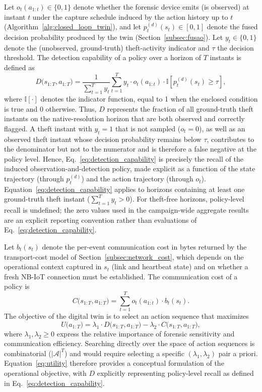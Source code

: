 \documentclass{ieeeaccess}
\begin{document}
Let $o_t(a_{1:t}) \in \{0,1\}$ denote whether the forensic device emits (is observed) at instant $t$ under the capture schedule induced by the action history up to $t$ (Algorithm~\ref{alg:closed_loop_twin}), and let $p_t^{(d)}(s_t) \in [0,1]$ denote the fused decision probability produced by the twin (Section~\ref{subsec:fusao}). Let $y_t \in \{0,1\}$ denote the (unobserved, ground-truth) theft-activity indicator and $\tau$ the decision threshold. The detection capability of a policy over a horizon of $T$ instants is defined as
\begin{equation}
D\big(s_{1:T}, a_{1:T}\big) =
\frac{1}{\sum_{t=1}^{T} y_t}
\sum_{t=1}^{T}
y_t \cdot o_t(a_{1:t}) \cdot
\mathbb{I}\left[p_t^{(d)}(s_t)\ge\tau\right],
\label{eq:detection_capability}
\end{equation}
where $\mathbb{I}[\cdot]$ denotes the indicator function, equal to 1 when the enclosed condition is true and 0 otherwise. Thus, $D$ represents the fraction of all ground-truth theft instants on the native-resolution horizon that are both observed and correctly flagged. A theft instant with $y_t=1$ that is not sampled ($o_t=0$), as well as an observed theft instant whose decision probability remains below $\tau$, contributes to the denominator but not to the numerator and is therefore a false negative at the policy level. Hence, Eq.~\eqref{eq:detection_capability} is precisely the recall of the induced observation-and-detection policy, made explicit as a function of the state trajectory (through $p_t^{(d)}$) and the action trajectory (through $o_t$). Equation~\eqref{eq:detection_capability} applies to horizons containing at least one ground-truth theft instant ($\sum_{t=1}^{T} y_t>0$). For theft-free horizons, policy-level recall is undefined; the zero values used in the campaign-wide aggregate results are an explicit reporting convention rather than evaluations of Eq.~\eqref{eq:detection_capability}.

Let $b_t(s_t)$ denote the per-event communication cost in bytes returned by the transport-cost model of Section~\ref{subsec:network_cost}, which depends on the operational context captured in $s_t$ (link and heartbeat state) and on whether a fresh NB-IoT connection must be established. The communication cost of a policy is
\begin{equation}
C\big(s_{1:T}, a_{1:T}\big) = \sum_{t=1}^{T} o_t(a_{1:t}) \cdot b_t(s_t).
\label{eq:communication_cost}
\end{equation}
The objective of the digital twin is to select an action sequence that maximizes
\begin{equation}
U\big(a_{1:T}\big) = \lambda_1 \cdot D\big(s_{1:T}, a_{1:T}\big) - \lambda_2 \cdot C\big(s_{1:T}, a_{1:T}\big),
\label{eq:utility}
\end{equation}
where $\lambda_1,\lambda_2\geq 0$ express the relative importance of forensic sensitivity and communication efficiency. Searching directly over the space of action sequences is combinatorial ($|\mathcal{A}|^T$) and would require selecting a specific $(\lambda_1,\lambda_2)$ pair a priori. Equation~\eqref{eq:utility} therefore provides a conceptual formulation of the operational objective, with $D$ explicitly representing policy-level recall as defined in Eq.~\eqref{eq:detection_capability}.
\end{document}
